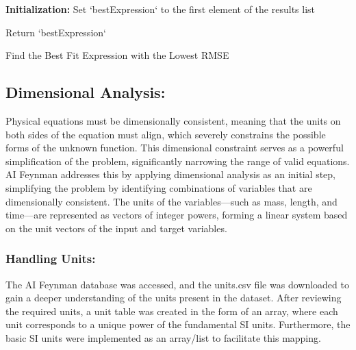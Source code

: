 \documentclass{article}
\begin{document}
\begin{algorithm}[H]
\SetAlgoLined
{}

\textbf{Initialization:}\;
Set `bestExpression` to the first element of the results list\;


Return `bestExpression`\;

\caption{Find the Best Fit Expression with the Lowest RMSE}
\label{alg:best_fit}
\end{algorithm}



\subsection{Dimensional Analysis: }

Physical equations must be dimensionally consistent, meaning that the units on both sides of the equation must align, which severely constrains the possible forms of the unknown function. This dimensional constraint serves as a powerful simplification of the problem, significantly narrowing the range of valid equations. AI Feynman addresses this by applying dimensional analysis as an initial step, simplifying the problem by identifying combinations of variables that are dimensionally consistent. The units of the variables—such as mass, length, and time—are represented as vectors of integer powers, forming a linear system based on the unit vectors of the input and target variables.





\subsubsection{Handling Units:}

The AI Feynman database was accessed, and the units.csv file was downloaded to gain a deeper understanding of the units present in the dataset. After reviewing the required units, a unit table was created in the form of an array, where each unit corresponds to a unique power of the fundamental SI units. Furthermore, the basic SI units were implemented as an array/list to facilitate this mapping.\\
\end{document}
